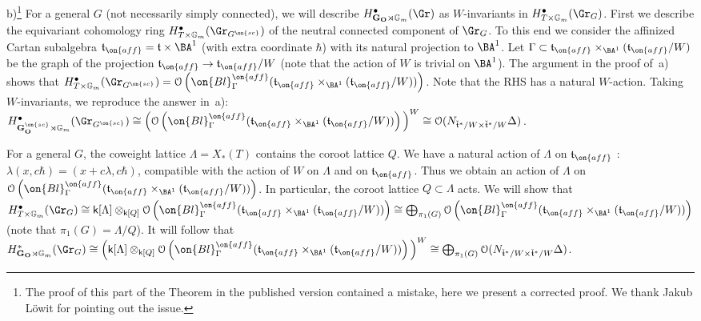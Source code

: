 \documentclass[11pt]{amsart}
\theoremstyle{definition}
\theoremstyle{remark}
\renewcommand{\O}{{\mathcal O}}
\theoremstyle{remark}
\newcommand{\cal}{\mathcal}
\newcommand{\<}{\langle}
\renewcommand{\>}{\rangle}
\renewcommand{\t}{{\frak t}}
\newcommand{\Lt}{\check{\mathfrak t}{}}
\renewcommand{\O}{{\cal O}}
\newcommand{\GO}{{\bf G_O}}
\newcommand{\Gm}{{{\mathbb G}_m}}
\newcommand{\kk}{\mathsf k}
\begin{document}
b)\footnote{The proof of this part of the Theorem in the published version contained a mistake, here we present a corrected proof. We thank Jakub L\"owit for pointing
out the issue.}
 For a general $G$ (not necessarily simply connected), we will describe $H^\bullet_{\GO\rtimes\Gm}(\Gr)$ as $W$-invariants in $H^\bullet_{T\times\Gm}(\Gr_G)$.
First we describe the equivariant cohomology ring $H^\bullet_{T\times\Gm}(\Gr_{G^{\on{sc}}})$ of the neutral
connected component of $\Gr_G$. To this end we consider the affinized Cartan subalgebra $\t_{\on{aff}}=\t\times\BA^1$
(with extra coordinate $\hbar$) with its natural projection to $\BA^1$. Let
$\Gamma\subset\t_{\on{aff}}\times_{\BA^1}(\t_{\on{aff}}/W)$ be the graph of the projection
$\t_{\on{aff}}\to\t_{\on{aff}}/W$ (note that the action of $W$ is trivial on $\BA^1$). The argument in the proof
of~a) shows that
$H^\bullet_{T\times\Gm}(\Gr_{G^{\on{sc}}})=\O\left(\on{Bl}^{\on{aff}}_\Gamma(\t_{\on{aff}}\times_{\BA^1}(\t_{\on{aff}}/W))\right)$.
Note that the RHS has a natural $W$-action. Taking $W$-invariants, we reproduce the answer in~a):
$H^\bullet_{{\mathbf G}^{\on{sc}}_{\mathbf O} \rtimes \Gm}(\Gr_{G^{\on{sc}}})\cong
\Big(\O\left(\on{Bl}^{\on{aff}}_\Gamma(\t_{\on{aff}}\times_{\BA^1}(\t_{\on{aff}}/W))\right)\Big)^W\cong\O(N_{\Lt^*/W\times \Lt^*/W}\Delta)$.

For a general $G$, the coweight lattice $\Lambda=X_*(T)$ contains the coroot
lattice $Q$. We have a natural action of $\Lambda$ on $\t_{\on{aff}}$ : $\lambda(x,c\hbar)=(x+c\lambda,c\hbar)$,
compatible with the action of $W$ on $\Lambda$ and on $\t_{\on{aff}}$. Thus we obtain an action of $\Lambda$
on $\O\left(\on{Bl}^{\on{aff}}_\Gamma(\t_{\on{aff}}\times_{\BA^1}(\t_{\on{aff}}/W))\right)$. In particular, the coroot lattice
$Q\subset\Lambda$ acts. We will show that
$H^\bullet_{T\times\Gm}(\Gr_G)\cong\kk[\Lambda]\otimes_{\kk[Q]}
\O\left(\on{Bl}^{\on{aff}}_\Gamma(\t_{\on{aff}}\times_{\BA^1}(\t_{\on{aff}}/W))\right)\cong\bigoplus_{\pi_1(G)}
\O\left(\on{Bl}^{\on{aff}}_\Gamma(\t_{\on{aff}}\times_{\BA^1}(\t_{\on{aff}}/W))\right)$
(note that $\pi_1(G)=\Lambda/Q$). It will follow that
$H^*_{\GO \rtimes \Gm}(\Gr_G)\cong\Big(\kk[\Lambda]\otimes_{\kk[Q]}\O\left(\on{Bl}^{\on{aff}}_\Gamma(\t_{\on{aff}}\times_{\BA^1}(\t_{\on{aff}}/W))\right)\Big)^W\cong\bigoplus_{\pi_1(G)}\O(N_{\Lt^*/W\times \Lt^*/W}\Delta)$.
\end{document}
